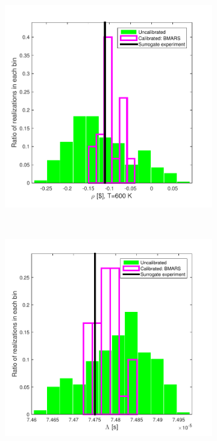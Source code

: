 \documentclass[review]{elsarticle}
\begin{document}
\begin{figure}[ht!]
\begin{subfigure}{0.5\textwidth}
\centering
\includegraphics[width=0.9\linewidth]{NSE15-48R1_Figure16a.pdf}
\label{bmtrho6k}
\end{subfigure}
~
\begin{subfigure}{0.5\textwidth}
\centering
\includegraphics[width=0.9\linewidth]{NSE15-48R1_Figure16b.pdf}

\end{subfigure}
\end{figure}
\end{document}
